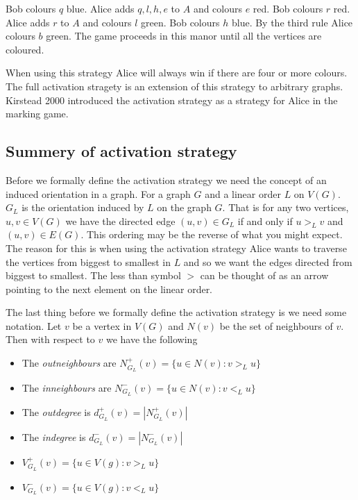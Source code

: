 Bob colours $q$ blue. Alice adds $q,l,h,e$ to $A$ and colours $e$ red. Bob colours $r$ red. Alice adds $r$ to $A$ and colours $l$ green. Bob colours $h$ blue. By the third rule Alice colours $b$ green. The game proceeds in this manor until all the vertices are coloured. 

When using this strategy Alice will always win if there are four or more colours. The full activation stragety is an extension of this strategy to arbitrary graphs. 
 Kirstead 2000 \cite{KIERSTEAD2000} introduced the activation strategy as a strategy for Alice in the marking game. 
 
\subsection{Summery of activation strategy}
%
Before we formally define the activation strategy we need the concept of an induced orientation in a graph. For a graph $G$ and a linear order $L$ on $V(G)$. $G_L$ is the orientation induced by $L$ on the graph $G$. That is for any two vertices, $u,v\in V(G)$ we have the directed edge $(u,v)\in G_L$ if and only if $u>_Lv$ and $(u,v)\in E(G)$. This ordering may be the reverse of what you might expect. The reason for this is when using the activation strategy Alice wants to traverse the vertices from biggest to smallest in $L$ and so we want the edges directed from biggest to smallest. The less than symbol $>$ can be thought of as an arrow pointing to the next element on the linear order.

The last thing before we formally define the activation strategy is we need some notation. Let $v$ be a vertex in $V(G)$ and $N(v)$ be the set of neighbours of $v$. Then with respect to $v$ we have the following
\begin{itemize}        
    \item The \textit{outneighbours} are $N^+_{G_L}(v)=\{u\in N(v):v>_L u\}$ 
    \item The \textit{inneighbours} are $N^-_{G_L}(v)=\{u\in N(v):v<_L u\}$ 
    \item The \textit{outdegree} is $d^+_{G_L}(v)=|N^+_{G_L}(v)|$ 
    \item The \textit{indegree} is $d^-_{G_L}(v)=|N^-_{G_L}(v)|$
    \item $V^+_{G_L}(v)=\{u\in V(g):v>_L u\}$     
    \item $V^-_{G_L}(v)=\{u\in V(g):v<_L u\}$ 
\end{itemize}

